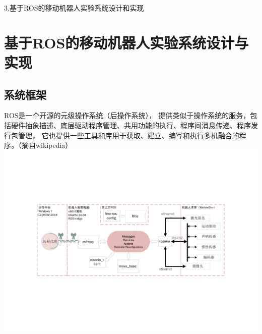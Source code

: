 \documentclass{beamer}
\begin{document}
\begin{frame}[t]{3.基于ROS的移动机器人实验系统设计和实现}
    \section{基于ROS的移动机器人实验系统设计与实现}
    \subsection{系统框架}
    ROS是一个开源的元级操作系统（后操作系统），
    提供类似于操作系统的服务，包括硬件抽象描述、底层驱动程序管理、共用功能的执行、程序间消息传递、程序发行包管理，
    它也提供一些工具和库用于获取、建立、编写和执行多机融合的程序。（摘自wikipedia）
    \includegraphics[scale=0.45]{./resource/graph/10-visio2010.pdf}
\end{frame}
\end{document}
